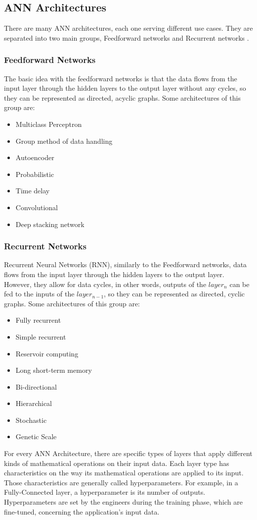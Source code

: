 \subsection{ANN Architectures}
There are many ANN architectures, each one serving different use cases. They are separated into two main groups, Feedforward networks and Recurrent networks \cite{Types-of-Artificial-Neural-Networks}.

\subsubsection{Feedforward Networks}
The basic idea with the feedforward networks is that the data flows from the input layer through the hidden layers to the output layer without any cycles, so they can be represented as directed, acyclic graphs. Some architectures of this group are:
\begin{itemize}
	\item Multiclass Perceptron
	\item Group method of data handling
	\item Autoencoder
	\item Probabilistic
	\item Time delay
	\item Convolutional
	\item Deep stacking network
\end{itemize}

\subsubsection{Recurrent Networks}
Recurrent Neural Networks (RNN), similarly to the Feedforward networks, data flows from the input layer through the hidden layers to the output layer. However, they allow for data cycles, in other words, outputs of the $layer_n$ can be fed to the inputs of the $layer_{n-1}$, so they can be represented as directed, cyclic graphs. Some architectures of this group are:
\begin{itemize}
	\item Fully recurrent
	\item Simple recurrent
	\item Reservoir computing
	\item Long short-term memory
	\item Bi-directional
	\item Hierarchical
	\item Stochastic
	\item Genetic Scale
\end{itemize}
For every ANN Architecture, there are specific types of layers that apply different kinds of mathematical operations on their input data. Each layer type has characteristics on the way its mathematical operations are applied to its input. Those characteristics are generally called hyperparameters. For example, in a Fully-Connected layer, a hyperparameter is its number of outputs. Hyperparameters are set by the engineers during the training phase, which are fine-tuned, concerning the application's input data.

